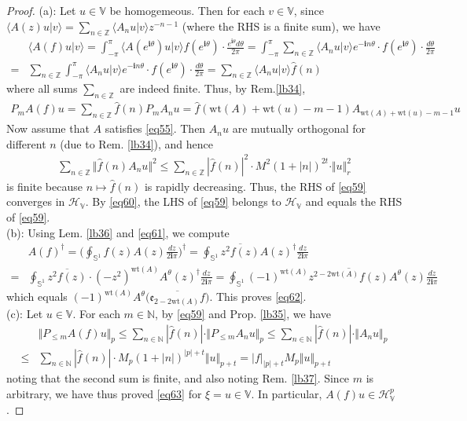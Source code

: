 \documentclass[12pt,b5paper,notitlepage]{article}
\theoremstyle{definition}
\theoremstyle{plain}
\newcommand{\wht}{\widehat}
\newcommand{\ovl}{\overline}
\newcommand{\bk}[1]{\langle {#1}\rangle}
\newcommand{\im}{\mathbf{i}}
\newcommand{\Vbb}{\mathbb V}
\newcommand{\Nbb}{\mathbb N}
\newcommand{\Zbb}{\mathbb Z}
\newcommand{\wt}{\mathrm{wt}}
\newcommand{\Sbb}{{\mathbb S}}
\newcommand{\HV}{\mathcal H_{\mathbb V}}
\newcommand{\ek}{\mathfrak{e}}
\newcommand{\ointn}{\oint\nolimits}
\numberwithin{equation}{section}
\begin{document}
\begin{proof}
(a): Let $u\in\Vbb$ be homogemeous. Then for each $v\in\Vbb$, since $\bk{A(z)u|v}=\sum_{n\in\Zbb}\bk{A_nu|v}z^{-n-1}$ (where the RHS is a finite sum), we have
\begin{align*}
&\bk{A(f)u|v}=\int_{-\pi}^\pi \bk{A(e^{\im \theta})u|v}f(e^{\im \theta})\cdot \frac{e^{\im\theta}d\theta}{2\pi}=\int_{-\pi}^\pi \sum_{n\in\Zbb}\bk{A_nu|v}e^{-\im n\theta}\cdot f(e^{\im \theta})\cdot \frac{d\theta}{2\pi}\\
=& \sum_{n\in\Zbb}\int_{-\pi}^\pi\bk{A_nu|v}e^{-\im n\theta}\cdot f(e^{\im \theta})\cdot \frac{d\theta}{2\pi}=\sum_{n\in\Zbb} \bk{A_nu|v}\wht f(n)
\end{align*}
where all sums $\sum_{n\in\Zbb}$ are indeed finite. Thus, by Rem.\ref{lb34},
\begin{align*}
P_mA(f)u=\sum_{n\in\Zbb}\wht f(n)P_mA_nu=\wht f(\wt(A)+\wt(u)-m-1)A_{\wt(A)+\wt(u)-m-1}u  \tag{$\star$}\label{eq60}
\end{align*}
Now assume that $A$ satisfies \eqref{eq55}. Then $A_nu$ are mutually orthogonal for different $n$ (due to Rem. \ref{lb34}), and hence
\begin{align*}
\sum_{n\in\Zbb} \Vert \wht f(n)A_nu\Vert^2\leq \sum_{n\in\Zbb} |\wht f(n)|^2 \cdot M^2(1+|n|)^{2t}\cdot\Vert u\Vert_r^2
\end{align*}
is finite because $n\mapsto\wht f(n)$ is rapidly decreasing. Thus, the RHS of \eqref{eq59} converges in $\HV$. By \eqref{eq60}, the LHS of \eqref{eq59} belongs to $\HV$ and equals the RHS of \eqref{eq59}.\\[-1ex]

(b): Using Lem. \ref{lb36} and \eqref{eq61}, we compute
\begin{align*}
&A(f)^\dagger=\Big(\ointn_{\Sbb^1}f(z)A(z)\frac{dz}{2\im\pi}\Big)^\dagger=\ointn_{\Sbb^1} \ovl{z^2f(z)}A(z)^\dagger\frac{dz}{2\im\pi}\\
=&\ointn_{\Sbb^1} \ovl{z^2f(z)}\cdot (-z^2)^{\wt(A)}A^\theta(z)^\dagger\frac{dz}{2\im\pi}=\ointn_{\Sbb^1}(-1)^{\wt(A)}\ovl{z^{2-2\wt(A)}f(z)}A^\theta(z)\frac{dz}{2\im\pi}
\end{align*}
which equals $(-1)^{\wt(A)}A^\theta\big(\ovl{\ek_{2-2\wt(A)}f}\big)$. This proves \eqref{eq62}.\\[-1ex]

(c): Let $u\in\Vbb$. For each $m\in\Nbb$, by \eqref{eq59} and Prop. \ref{lb35}, we have
\begin{align*}
&\Vert P_{\leq m}A(f)u\Vert_p\leq\sum_{n\in\Nbb}|\wht f(n)|\cdot \Vert P_{\leq m}A_nu\Vert_p\leq \sum_{n\in\Nbb}|\wht f(n)|\cdot \Vert A_nu\Vert_p\\
\leq& \sum_{n\in\Nbb} |\wht f(n)|\cdot M_p(1+|n|)^{|p|+t}\Vert u\Vert_{p+t}=|f|_{|p|+t}M_p\Vert u\Vert_{p+t}
\end{align*}
noting that the second sum is finite, and also noting Rem. \ref{lb37}. Since $m$ is arbitrary, we have thus proved \eqref{eq63} for $\xi=u\in\Vbb$. In particular, $A(f)u\in\HV^p$.



\end{proof}
\end{document}
